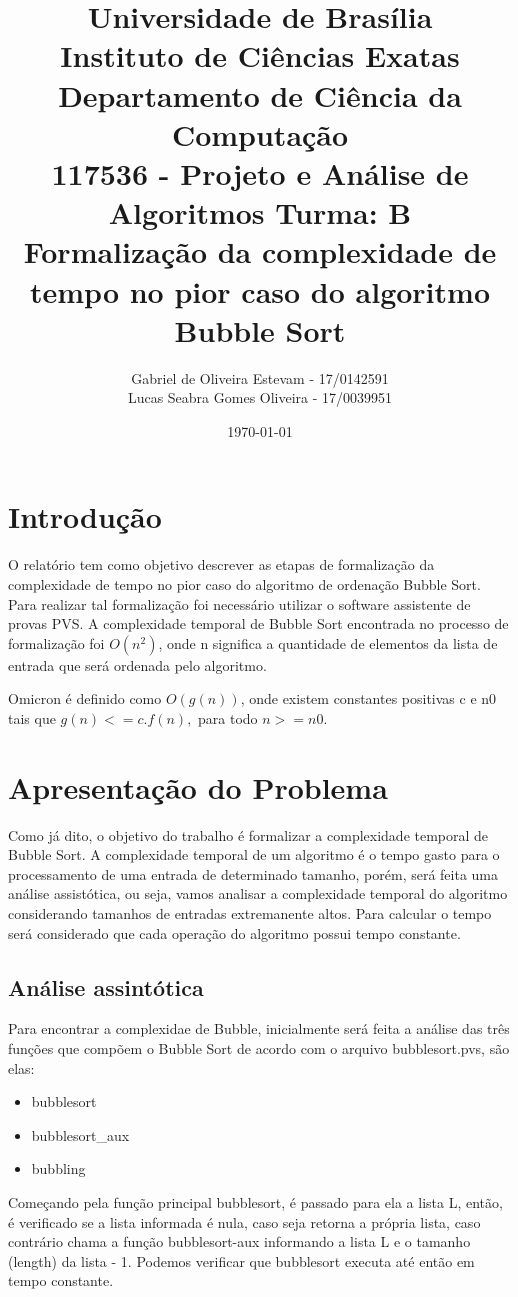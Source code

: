 \documentclass[12pt]{article}
\title{{\large Universidade de Brasília \\ Instituto de Ciências Exatas \\
Departamento de Ciência da Computação} \\[1cm]
117536 - Projeto e Análise de Algoritmos Turma: B\\[.5cm]
{\bf Formalização da complexidade de tempo no pior caso do algoritmo Bubble Sort}}
\author{Gabriel de Oliveira Estevam - 17/0142591 \\
        Lucas Seabra Gomes Oliveira - 17/0039951}
\date{\today}
\begin{document}
\maketitle
\newpage

\section{Introdução}
O relatório tem como objetivo descrever as etapas de formalização da complexidade de tempo no pior caso do algoritmo de ordenação Bubble Sort. Para realizar tal formalização foi necessário utilizar o software assistente de provas PVS. A complexidade temporal de Bubble Sort encontrada no processo de formalização foi $O(n^2)$, onde n significa a quantidade de elementos da lista de entrada que será ordenada pelo algoritmo.  

Omicron é definido como $O(g(n))$, onde existem constantes positivas c e n0 tais que $g(n) <= c.f(n),$ para todo $n >= n0$.

\section{Apresentação do Problema}
Como já dito, o objetivo do trabalho é formalizar a complexidade temporal de Bubble Sort. A complexidade temporal de um algoritmo é o tempo gasto para o processamento de uma entrada de determinado tamanho, porém, será feita uma análise assistótica, ou seja, vamos analisar a complexidade temporal do algoritmo considerando tamanhos de entradas extremanente altos. Para calcular o tempo será considerado que cada operação do algoritmo possui tempo constante.  

\subsection{Análise assintótica}


Para encontrar a complexidae de Bubble, inicialmente será feita a análise das três funções que compõem o Bubble Sort de acordo com o arquivo bubblesort.pvs, são elas:

\begin{itemize}
    \item bubblesort
    \item bubblesort\_aux
    \item bubbling
\end{itemize}

Começando pela função principal bubblesort, é passado para ela a lista L, então, é verificado se a lista informada é nula, caso seja retorna a própria lista, caso contrário chama a função bubblesort-aux informando a lista L e o tamanho (length) da lista - 1. Podemos verificar que bubblesort executa até então em tempo constante.
\end{document}

